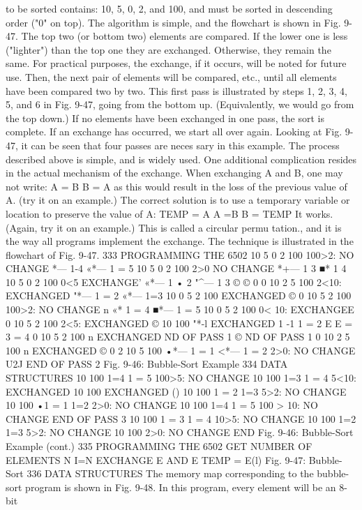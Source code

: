 {{{{{{{{{{{{{{{{{{{{{{{{{{{{{{{{{{{{{{{{{{{{{{{{{{{{{{{{{{{{{{{{{{{{{{{{{{{{{{{{{{{{{{{{{{{{{{to be sorted contains: 10, 5, 0, 2, and 100, and must be sorted in
descending order ("0" on top). The algorithm is simple, and the
flowchart is shown in Fig. 9-47.
The top two (or bottom two) elements are compared. If the
lower one is less ("lighter") than the top one they are exchanged.
Otherwise, they remain the same. For practical purposes, the exchange,
if it occurs, will be noted for future use. Then, the next pair of elements
will be compared, etc., until all elements have been compared two by two.
This first pass is illustrated by steps 1, 2, 3, 4, 5, and 6 in Fig. 9-47,
going from the bottom up. (Equivalently, we would go from the top
down.)
If no elements have been exchanged in one pass, the sort is complete.
If an exchange has occurred, we start all over again.
Looking at Fig. 9-47, it can be seen that four passes are neces
sary in this example.
The process described above is simple, and is widely used.
One additional complication resides in the actual mechanism of
the exchange. When exchanging A and B, one may not write:
A = B
B = A
as this would result in the loss of the previous value of A. (try it on
an example.)
The correct solution is to use a temporary variable or location to
preserve the value of A:
TEMP = A
A =B
B = TEMP
It works. (Again, try it on an example.) This is called a circular permu
tation., and it is the way all programs implement the exchange. The
technique is illustrated in the flowchart of Fig. 9-47.
333
PROGRAMMING THE 6502
10
5
0
2
100
100>2:
NO CHANGE
*— 1-4
«*— 1 = 5
10
5
0
2
100
2>0
NO CHANGE
*+— 1 3
■* 1 4
10
5
0
2
100
0<5
EXCHANGE'
«*— 1 • 2
"^— 1 3
© ©
0
0
10
2
5
100
2<10:
EXCHANGED
"*— 1 = 2
«*— 1=3
10
0
5
2
100
EXCHANGED
©
0
10
5
2
100
100>2:
NO CHANGE
n
«* 1 = 4
■*— 1 = 5
10
0
5
2
100
0< 10:
EXCHANGEE
0
10
5
2
100
2<5:
EXCHANGED
©
10
100
"*-l
EXCHANGED
1 -1
1 = 2
E
E
= 3
= 4
0
10
5
2
100
n
EXCHANGED
ND OF PASS 1
©
ND OF PASS 1
0
10
2
5
100
n
EXCHANGED
©
0
2
10
5
100
•*— 1 = 1
<*— 1 = 2
2>0:
NO CHANGE
U2J
END OF PASS 2
Fig. 9-46: Bubble-Sort Example
334
DATA STRUCTURES
10
100
1=4
1 = 5
100>5:
NO CHANGE
10
100
1=3
1 = 4
5<10:
EXCHANGED
10
100
EXCHANGED
(\5)
10
100
1 = 2
1=3
5>2:
NO CHANGE
10
100
•1 = 1
1=2
2>0:
NO CHANGE
10
100
1=4
1 = 5
100 > 10:
NO CHANGE
END OF PASS 3
10
100
1 = 3
1 = 4
10>5:
NO CHANGE
10
100
1=2
1=3
5>2:
NO CHANGE
10
100
2>0:
NO CHANGE
END
Fig. 9-46: Bubble-Sort Example (cont.)
335
PROGRAMMING THE 6502
GET NUMBER OF
ELEMENTS N
I=N
EXCHANGE E AND E
TEMP = E(l)
Fig. 9-47: Bubble-Sort
336
DATA STRUCTURES
The memory map corresponding to the bubble-sort program is
shown in Fig. 9-48. In this program, every element will be an 8-bit
}}}}}}}}}}}}}}}}}}}}}}}}}}}}}}}}}}}}}}}}}}}}}}}}}}}}}}}}}}}}}}}}}}}}}}}}}}}}}}}}}}}}}}}}}}}}}}
